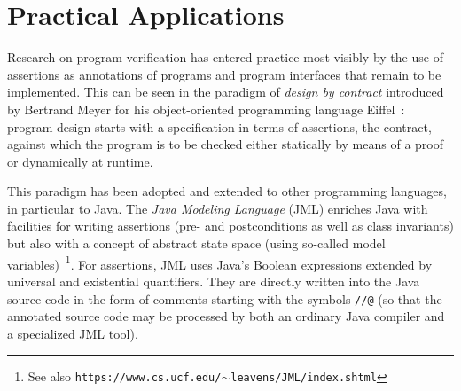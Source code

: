 \documentclass[manuscript, screen, review]{acmart}
\begin{document}



\section{Practical Applications}

Research on program verification has entered practice most visibly by
the use of assertions as annotations of programs and program
interfaces that remain to be implemented.  This can be seen in the
paradigm of \emph{design by contract} introduced by Bertrand Meyer for
his object-oriented programming language Eiffel~\cite{Mey97}: program
design starts with a specification in terms of assertions, the
contract, against which the program is to be checked either statically
by means of a proof or dynamically at runtime.

This paradigm has been adopted and extended to other programming
languages, in particular to Java.
The \emph{Java Modeling Language} (JML) enriches Java with facilities for 
writing assertions (pre- and postconditions as well as 
class invariants) but also with a concept of abstract state space 
(using so-called model variables)~\cite{JML05}\footnote{See also
  \texttt{https://www.cs.ucf.edu/$\sim$leavens/JML/index.shtml}}.
For assertions, JML uses Java’s Boolean expressions extended by
universal and existential quantifiers. 
They are directly written into the Java source code in the form of comments 
starting with the symbols \texttt{//@}
(so that the annotated source code may be processed by both an ordinary Java compiler 
and a specialized JML tool). 
\end{document}
